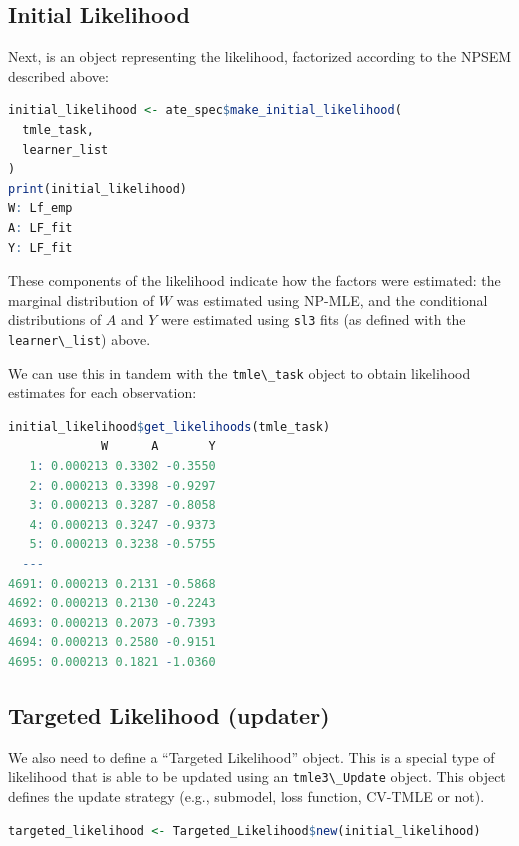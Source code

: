 \documentclass[
  12pt, krantz2,
]{krantz}
\newcommand{\passthrough}[1]{#1}
\newcommand{\1}{\mathbbm{1}}
\theoremstyle{definition}
\theoremstyle{definition}
\theoremstyle{definition}
\theoremstyle{definition}
\theoremstyle{remark}
\begin{document}
\hypertarget{initial-likelihood}{%
\subsection{Initial Likelihood}\label{initial-likelihood}}

Next, is an object representing the likelihood, factorized according to the
NPSEM described above:

\begin{lstlisting}[language=R]
initial_likelihood <- ate_spec$make_initial_likelihood(
  tmle_task,
  learner_list
)
print(initial_likelihood)
W: Lf_emp
A: LF_fit
Y: LF_fit
\end{lstlisting}

These components of the likelihood indicate how the factors were estimated: the
marginal distribution of \(W\) was estimated using NP-MLE, and the conditional
distributions of \(A\) and \(Y\) were estimated using \passthrough{\lstinline!sl3!} fits (as defined with
the \passthrough{\lstinline!learner\_list!}) above.

We can use this in tandem with the \passthrough{\lstinline!tmle\_task!} object to obtain likelihood
estimates for each observation:

\begin{lstlisting}[language=R]
initial_likelihood$get_likelihoods(tmle_task)
             W      A       Y
   1: 0.000213 0.3302 -0.3550
   2: 0.000213 0.3398 -0.9297
   3: 0.000213 0.3287 -0.8058
   4: 0.000213 0.3247 -0.9373
   5: 0.000213 0.3238 -0.5755
  ---                        
4691: 0.000213 0.2131 -0.5868
4692: 0.000213 0.2130 -0.2243
4693: 0.000213 0.2073 -0.7393
4694: 0.000213 0.2580 -0.9151
4695: 0.000213 0.1821 -1.0360
\end{lstlisting}

\hypertarget{targeted-likelihood-updater}{%
\subsection{Targeted Likelihood (updater)}\label{targeted-likelihood-updater}}

We also need to define a ``Targeted Likelihood'' object. This is a special type
of likelihood that is able to be updated using an \passthrough{\lstinline!tmle3\_Update!} object. This
object defines the update strategy (e.g., submodel, loss function, CV-TMLE or
not).

\begin{lstlisting}[language=R]
targeted_likelihood <- Targeted_Likelihood$new(initial_likelihood)
\end{lstlisting}
\end{document}
